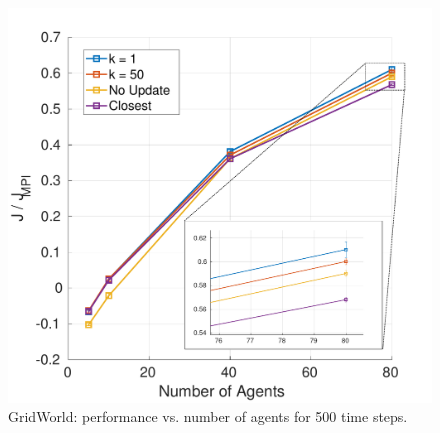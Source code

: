 \documentclass[journal]{IEEEtran}
\begin{document}
\begin{figure}
    \centering
    \includegraphics[scale = 0.4, trim={0cm 0cm 0cm 0cm}, clip]{gridworld_dist_performance_ni_v4.pdf} 
    \caption{GridWorld: performance vs. number of agents for 500 time steps.}
    \label{fig:dist_performance_ni}
\end{figure}
\end{document}
